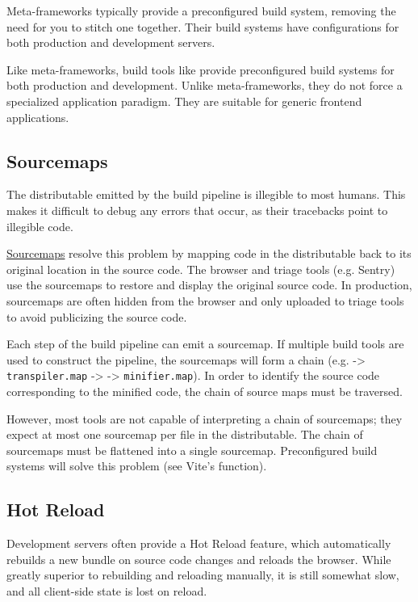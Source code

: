 \documentclass{article}
\begin{document}
Meta-frameworks typically provide a preconfigured build system, removing the need for you to stitch
one together. Their build systems have configurations for both production and development servers.

Like meta-frameworks, build tools like \href{https://vitejs.dev/}{} provide preconfigured
build systems for both production and development. Unlike meta-frameworks, they do not force a
specialized application paradigm. They are suitable for generic frontend applications.

\subsection{Sourcemaps}

The distributable emitted by the build pipeline is illegible to most humans. This makes it difficult
to debug any errors that occur, as their tracebacks point to illegible code.

\href{https://developer.chrome.com/blog/sourcemaps/}{Sourcemaps} resolve this problem by mapping
code in the distributable back to its original location in the source code. The browser and triage
tools (e.g. Sentry) use the sourcemaps to restore and display the original source code. In
production, sourcemaps are often hidden from the browser and only uploaded to triage tools to avoid
publicizing the source code.

Each step of the build pipeline can emit a sourcemap. If multiple build tools are used to construct
the pipeline, the sourcemaps will form a chain (e.g.  -> \texttt{transpiler.map} ->
 -> \texttt{minifier.map}). In order to identify the source code corresponding to
the minified code, the chain of source maps must be traversed.

However, most tools are not capable of interpreting a chain of sourcemaps; they expect at most one
sourcemap per file in the distributable. The chain of sourcemaps must be flattened into a single
sourcemap. Preconfigured build systems will solve this problem (see Vite's
\href{https://github.com/vitejs/vite/blob/feae09fdfab505e58950c915fe5d8dd103d5ffb9/packages/vite/src/node/utils.ts\#L831}{}
function).

\subsection{Hot Reload}

Development servers often provide a Hot Reload feature, which automatically rebuilds a new bundle on
source code changes and reloads the browser. While greatly superior to rebuilding and reloading
manually, it is still somewhat slow, and all client-side state is lost on reload.
\end{document}
